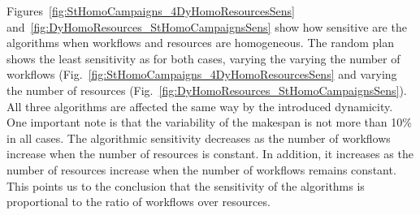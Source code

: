 Figures~\ref{fig:StHomoCampaigns_4DyHomoResourcesSens} and~\ref{fig:DyHomoResources_StHomoCampaignsSens} show how sensitive are the algorithms when workflows and resources are homogeneous.
The random plan shows the least sensitivity as for both cases, varying the varying the number of workflows (Fig.~\ref{fig:StHomoCampaigns_4DyHomoResourcesSens} and varying the number of resources (Fig.~\ref{fig:DyHomoResources_StHomoCampaignsSens}).
All three algorithms are affected the same way by the introduced dynamicity.
One important note is that the variability of the makespan is not more than 10\% in all cases.
The algorithmic sensitivity decreases as the number of workflows increase when the number of resources is constant.
In addition, it increases as the number of resources increase when the number of workflows remains constant.
This points us to the conclusion that the sensitivity of the algorithms is proportional to the ratio of workflows over resources.

